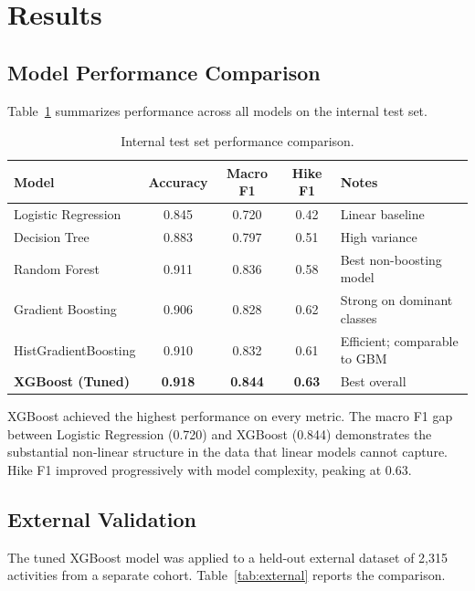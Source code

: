 \documentclass[11pt, onecolumn]{article}
\begin{document}
\section{Results}

\subsection{Model Performance Comparison}

Table~\ref{tab:model_comparison} summarizes performance across all models on the internal test set.

\begin{table}[H]
\centering
\caption{Internal test set performance comparison.}
\label{tab:model_comparison}
\begin{tabular}{lcccp{5cm}}
\toprule
\textbf{Model} & \textbf{Accuracy} & \textbf{Macro F1} & \textbf{Hike F1} & \textbf{Notes} \\
\midrule
Logistic Regression      & 0.845 & 0.720 & 0.42 & Linear baseline \\
Decision Tree            & 0.883 & 0.797 & 0.51 & High variance \\
Random Forest            & 0.911 & 0.836 & 0.58 & Best non-boosting model \\
Gradient Boosting        & 0.906 & 0.828 & 0.62 & Strong on dominant classes \\
HistGradientBoosting     & 0.910 & 0.832 & 0.61 & Efficient; comparable to GBM \\
\textbf{XGBoost (Tuned)} & \textbf{0.918} & \textbf{0.844} & \textbf{0.63} & Best overall \\
\bottomrule
\end{tabular}
\end{table}

XGBoost achieved the highest performance on every metric. The macro F1 gap between Logistic Regression (0.720) and XGBoost (0.844) demonstrates the substantial non-linear structure in the data that linear models cannot capture. Hike F1 improved progressively with model complexity, peaking at 0.63.

\subsection{External Validation}

The tuned XGBoost model was applied to a held-out external dataset of 2,315 activities from a separate cohort. Table~\ref{tab:external} reports the comparison.
\end{document}
